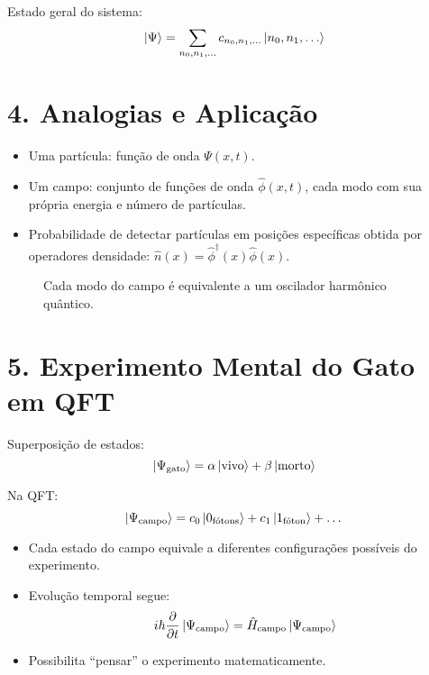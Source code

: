 \documentclass[12pt,a4paper]{article}
\begin{document}
Estado geral do sistema:
\begin{equation}
\ket{\Psi} = \sum_{n_0,n_1,\dots} c_{n_0,n_1,\dots} \ket{n_0, n_1, \dots}
\end{equation}

\section*{4. Analogias e Aplicação}

\begin{itemize}
    \item Uma partícula: função de onda \(\Psi(x,t)\).
    \item Um campo: conjunto de funções de onda \(\hat{\phi}(x,t)\), cada modo com sua própria energia e número de partículas.
    \item Probabilidade de detectar partículas em posições específicas obtida por operadores densidade: \(\hat{n}(x) = \hat{\phi}^\dagger(x)\hat{\phi}(x)\).
\end{itemize}

\begin{figure}[h!]
\centering
{}
\caption{Cada modo do campo é equivalente a um oscilador harmônico quântico.}
\end{figure}

\section*{5. Experimento Mental do Gato em QFT}

Superposição de estados:
\[
\ket{\Psi_\text{gato}} = \alpha \ket{\text{vivo}} + \beta \ket{\text{morto}}
\]

Na QFT:
\[
\ket{\Psi_\text{campo}} = c_0 \ket{0_\text{fótons}} + c_1 \ket{1_\text{fóton}} + \dots
\]

\begin{itemize}
    \item Cada estado do campo equivale a diferentes configurações possíveis do experimento.
    \item Evolução temporal segue:
    \[
    i \hbar \frac{\partial}{\partial t} \ket{\Psi_\text{campo}} = \hat{H}_\text{campo} \ket{\Psi_\text{campo}}
    \]
    \item Possibilita ``pensar'' o experimento matematicamente.
\end{itemize}
\end{document}
